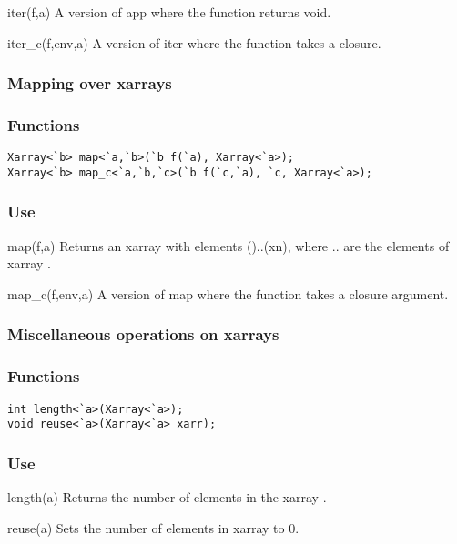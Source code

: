 \begin{defun}{iter}{(f,a)}
A version of app where the function  returns void.
\end{defun}

\begin{defun}{iter_c}{(f,env,a)}
A version of iter where the function  takes a closure.
\end{defun}

\subsubsection*{Mapping over xarrays}
\subsubsection*{Functions}
\begin{verbatim}
Xarray<`b> map<`a,`b>(`b f(`a), Xarray<`a>);
Xarray<`b> map_c<`a,`b,`c>(`b f(`c,`a), `c, Xarray<`a>);
\end{verbatim}

\subsubsection*{Use}

\begin{defun}{map}{(f,a)}
Returns an xarray with elements ()..(xn), where
.. are the elements of xarray .
\end{defun}

\begin{defun}{map_c}{(f,env,a)}
A version of map where the function  takes a closure argument.
\end{defun}

\subsubsection*{Miscellaneous operations on xarrays}
\subsubsection*{Functions}
\begin{verbatim}
int length<`a>(Xarray<`a>);
void reuse<`a>(Xarray<`a> xarr);
\end{verbatim}

\subsubsection*{Use}

\begin{defun}{length}{(a)}
Returns the number of elements in the xarray .
\end{defun}

\begin{defun}{reuse}{(a)}
Sets the number of elements in xarray  to 0.
\end{defun}

